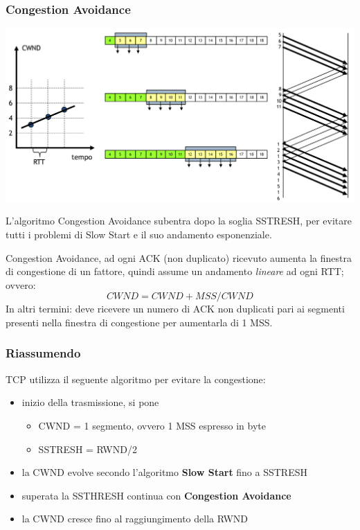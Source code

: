\documentclass[12pt]{article}
\begin{document}
\subsubsection{Congestion Avoidance}\label{tcp-congestione-congestion-avoidance}
\begin{center}
	\includegraphics[scale=0.35]{livello_trasporto-img7.png}
\end{center}
L'algoritmo Congestion Avoidance subentra dopo la soglia SSTRESH, per evitare tutti i problemi di Slow Start e
il suo andamento esponenziale.

Congestion Avoidance, ad ogni ACK (non duplicato) ricevuto aumenta la finestra di congestione di un fattore, quindi 
assume un andamento \textit{lineare} ad ogni RTT; ovvero:
\begin{equation}\label{eq:cwnd-congestion-avoidance}
	CWND = CWND + MSS/CWND
\end{equation}
In altri termini: deve ricevere un numero di ACK non duplicati pari ai segmenti presenti nella finestra di 
congestione per aumentarla di 1 MSS.

\subsubsection{Riassumendo}\label{tcp-congestione-riassumendo}
TCP utilizza il seguente algoritmo per evitare la congestione:
\begin{itemize}[noitemsep]
	\item inizio della trasmissione, si pone
	\begin{itemize}[noitemsep]
		\item CWND = 1 segmento, ovvero 1 MSS espresso in byte
		\item SSTRESH = RWND/2		
	\end{itemize}
	\item la CWND evolve secondo l'algoritmo \textbf{Slow Start} fino a SSTRESH
	\item superata la SSTHRESH continua con \textbf{Congestion Avoidance}
	\item la CWND cresce fino al raggiungimento della RWND
\end{itemize}
\end{document}
